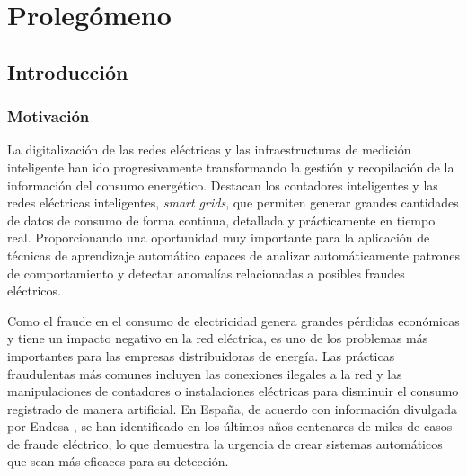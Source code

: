 \documentclass[12pt,a4paper]{report}
\begin{document}
\newpage
\listoffigures
\newpage

\newpage
\listoftables
\newpage

\newpage
\lstlistoflistings
\newpage

\cleardoublepage
{}
\setcounter{page}{1}

\part{Prolegómeno}


\chapter{Introducción}


\section{Motivación}

La digitalización de las redes eléctricas y las infraestructuras de medición inteligente han ido progresivamente transformando la gestión y recopilación de la información del consumo energético. Destacan los contadores inteligentes y las redes eléctricas inteligentes, \emph{smart grids}, que permiten generar grandes cantidades de datos de consumo de forma continua, detallada y prácticamente en tiempo real. Proporcionando una oportunidad muy importante para la aplicación de técnicas de aprendizaje automático capaces de analizar automáticamente patrones de comportamiento y detectar anomalías relacionadas a posibles fraudes eléctricos.

Como el fraude en el consumo de electricidad genera grandes pérdidas económicas y tiene un impacto negativo en la red eléctrica, es uno de los problemas más importantes para las empresas distribuidoras de energía. Las prácticas fraudulentas más comunes incluyen las conexiones ilegales a la red y las manipulaciones de contadores o instalaciones eléctricas para disminuir el consumo registrado de manera artificial. En España, de acuerdo con información divulgada por Endesa \cite{endesa}, se han identificado en los últimos años centenares de miles de casos de fraude eléctrico, lo que demuestra la urgencia de crear sistemas automáticos que sean más eficaces para su detección.
\end{document}
